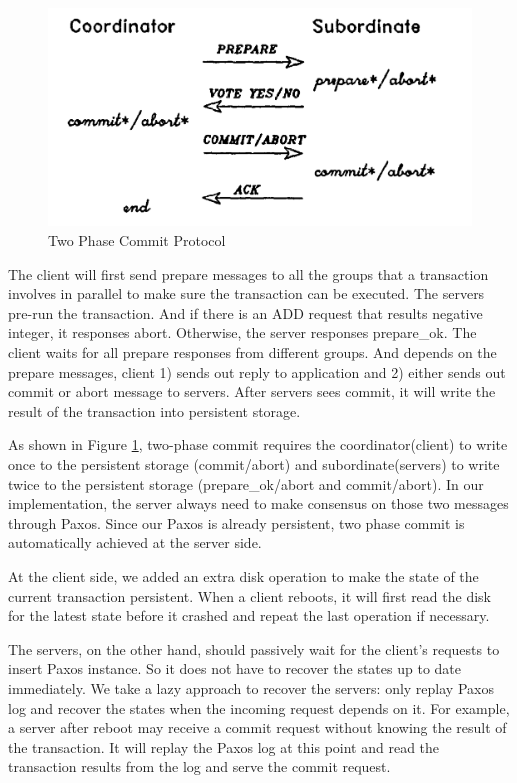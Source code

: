 \documentclass{vldb}
\begin{document}
\begin{figure}[h!]
  \centering
  \includegraphics[width = 0.8\linewidth]{figs/2PC.pdf}
  \caption{Two Phase Commit Protocol}
  \label{fig:2pc}
\end{figure}

The client will first send prepare messages to all the groups that a 
transaction involves in parallel to make sure the transaction can be 
executed. The servers pre-run the transaction. And if there is an ADD 
request that results negative integer, it responses abort. Otherwise, 
the server responses prepare\_ok. The client waits for all prepare 
responses from different groups. And depends on the prepare messages, 
client 1) sends out reply to application and 2) either sends out
commit or abort message to servers. After servers sees commit, it will 
write the result of the transaction into persistent storage.

As shown in Figure \cref{fig:2pc}, two-phase commit requires the 
coordinator(client) to write once to the persistent storage
(commit/abort) and subordinate(servers) to write twice to the 
persistent storage (prepare\_ok/abort and commit/abort). In our
implementation, the server always need to make consensus on those two 
messages through Paxos. Since our Paxos is already persistent, two 
phase commit is automatically achieved at the server side. 

At the client side, we added an extra disk operation to make the state 
of the current transaction persistent. When a client reboots, it will 
first read the disk for the latest state before it crashed and repeat 
the last operation if necessary. 

The servers, on the other hand, should passively wait for the client’s 
requests to insert Paxos instance. So it does not have to recover the 
states up to date immediately. We take a lazy approach to recover the 
servers: only replay Paxos log and recover the states when the 
incoming request depends on it. For example, a server after reboot may 
receive a commit request without knowing the result of the 
transaction. It will replay the Paxos log at this point and read the 
transaction results from the log and serve the commit request.
\end{document}
